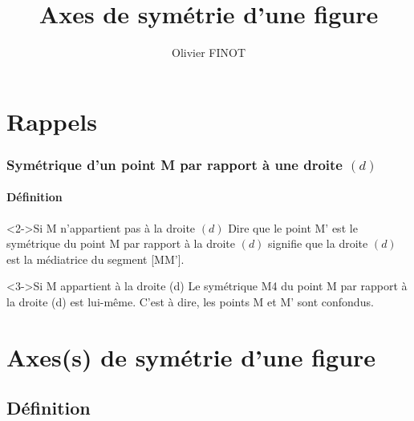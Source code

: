 \documentclass{beamer}
\title{Axes de symétrie d'une figure}
\author{Olivier FINOT}\institute{Collège Jules Ferry, Beaune}
\begin{document}
\begin{frame}
  \titlepage
\end{frame}


\section{Rappels}

\begin{frame}
\frametitle{Symétrique d'un point M par rapport à une droite $(d)$}  
\framesubtitle{Définition}

\begin{block}<2->{Si M n'appartient pas à la droite $(d)$}
Dire que le point M' est le symétrique du point M par rapport à la droite $(d)$ signifie que la droite $(d)$ est la médiatrice du segment [MM'].
\end{block}

\begin{block}<3->{Si M appartient à la droite (d)}
Le symétrique M4 du point M par rapport à la droite (d) est lui-même.
C'est à dire, les points M et M' sont confondus.
\end{block}

\end{frame}

\section{Axes(s) de symétrie d'une figure}

\subsection{Définition}
\end{document}
